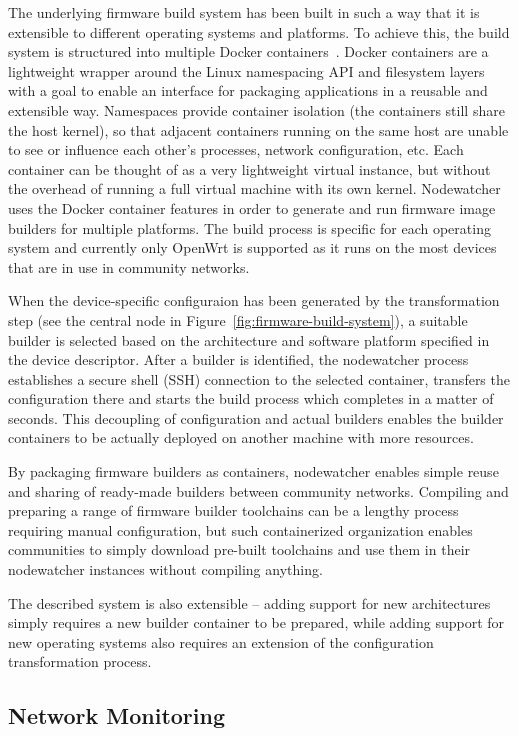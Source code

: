 \documentclass[5p,sort&compress]{elsarticle}
\begin{document}
The underlying firmware build system has been built in such a way that it is extensible to different operating systems and platforms.
To achieve this, the build system is structured into multiple Docker containers~\cite{Docker_2013}.
Docker containers are a lightweight wrapper around the Linux namespacing API and filesystem layers with a goal to enable an interface for packaging applications in a reusable and extensible way.
Namespaces provide container isolation (the containers still share the host kernel), so that adjacent containers running on the same host are unable to see or influence each other's processes, network configuration, etc.
Each container can be thought of as a very lightweight virtual instance, but without the overhead of running a full virtual machine with its own kernel.
Nodewatcher uses the Docker container features in order to generate and run firmware image builders for multiple platforms.
The build process is specific for each operating system and currently only OpenWrt is supported as it runs on the most devices that are in use in community networks.

When the device-specific configuraion has been generated by the transformation step (see the central node in Figure~\ref{fig:firmware-build-system}), a suitable builder is selected based on the architecture and software platform specified in the device descriptor.
After a builder is identified, the nodewatcher process establishes a secure shell (SSH) connection to the selected container, transfers the configuration there and starts the build process which completes in a matter of seconds.
This decoupling of configuration and actual builders enables the builder containers to be actually deployed on another machine with more resources.

By packaging firmware builders as containers, nodewatcher enables simple reuse and sharing of ready-made builders between community networks.
Compiling and preparing a range of firmware builder toolchains can be a lengthy process requiring manual configuration, but such containerized organization enables communities to simply download pre-built toolchains and use them in their nodewatcher instances without compiling anything.

The described system is also extensible -- adding support for new architectures simply requires a new builder container to be prepared, while adding support for new operating systems also requires an extension of the configuration transformation process.

\subsection{Network Monitoring}
\end{document}
